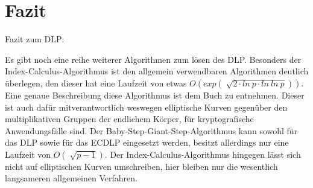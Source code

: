 \section{Fazit}
	Fazit zum DLP:
	
	Es gibt noch eine reihe weiterer Algorithmen zum lösen des DLP. Besonders der Index-Calculus-Algorithmus ist den allgemein verwendbaren Algorithmen deutlich überlegen, den dieser hat eine Laufzeit von etwas $O(exp(\sqrt[]{2 \cdot ln~p \cdot ln~ln~p}))$. Eine genaue Beschreibung diese Algorithmus ist dem Buch \cite{Einfuehrung:in:die:Kryptographie} zu entnehmen. Dieser ist auch dafür mitverantwortlich weswegen elliptische Kurven gegenüber den multiplikativen Gruppen der endlichem Körper, für kryptografische Anwendungsfälle  sind. Der Baby-Step-Giant-Step-Algorithmus kann sowohl für das DLP sowie für das ECDLP eingesetzt werden, besitzt allerdings nur eine Laufzeit von $O(\sqrt[]{p-1})$. Der Index-Calculus-Algorithmus hingegen lässt sich nicht auf elliptischen Kurven umschreiben, hier bleiben nur die wesentlich langsameren allgemeinen Verfahren.\cite{Mathematisch:fuer:fortgeschrittene:Anfaenger}